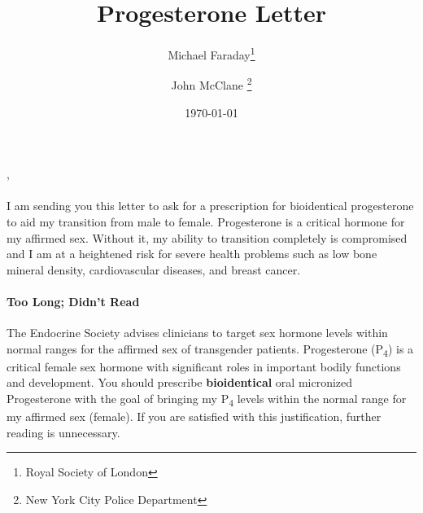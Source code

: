 \documentclass[
	secnumdepth=3, %
]{kaohandt}
\newcommand\tsub[1]{\textsubscript{#1}}
\begin{document}

\title[Progesterone Letter]{Progesterone Letter}

\author[MF, JMC]{Michael Faraday\thanks{Royal Society of London} \and John McClane \thanks{New York City Police Department}}

\date{\today}




,\\\\
I am sending you this letter to ask for a prescription for bioidentical progesterone to aid my transition from male to female. Progesterone is a critical hormone for my affirmed sex. Without it, my ability to transition completely is compromised and I am at a heightened risk for severe health problems such as low bone mineral density, cardiovascular diseases, and breast cancer.

\paragraph{Too Long; Didn't Read} The Endocrine Society advises clinicians to target sex hormone levels within normal ranges for the affirmed sex of transgender patients. Progesterone (P\tsub{4}) is a critical female sex hormone with significant roles in important bodily functions and development. You should prescribe \textbf{bioidentical} oral micronized Progesterone with the goal of bringing my P\tsub{4} levels within the normal range for my affirmed sex (female). If you are satisfied with this justification, further reading is unnecessary.


\end{document}
